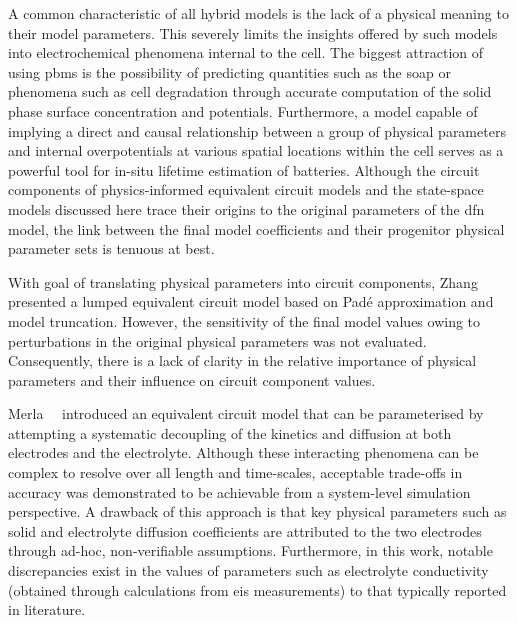 A  common  characteristic  of all  hybrid  models  is  the  lack of  a  physical
meaning to  their model  parameters. This severely  limits the  insights offered
by  such  models  into  electrochemical  phenomena internal  to  the  cell.  The
biggest  attraction  of  using  \glspl{pbm} is  the  possibility  of  predicting
quantities such as the \gls{soap} or  phenomena such as cell degradation through
accurate computation  of the solid  phase surface concentration  and potentials.
Furthermore,  a model  capable  of  implying a  direct  and causal  relationship
between a  group of physical  parameters and internal overpotentials  at various
spatial locations within the cell serves as a powerful tool for in-situ lifetime
estimation  of batteries.  Although the  circuit components  of physics-informed
equivalent circuit models and the  state-space models discussed here trace their
origins to the original parameters of  the \gls{dfn} model, the link between the
final model coefficients and their progenitor physical parameter sets is tenuous
at best.


With  goal   of  translating   physical  parameters  into   circuit  components,
Zhang~\etal{}~\cite{Zhang2017} presented a lumped equivalent circuit model based
on Padé  approximation and  model truncation. However,  the sensitivity  of the
final model  values owing to  perturbations in the original  physical parameters
was not  evaluated. Consequently,  there is  a lack of  clarity in  the relative
importance  of physical  parameters  and their  influence  on circuit  component
values.


Merla~\etal{}~\cite{Merla2018} introduced  an equivalent circuit model  that can
be  parameterised by  attempting a  systematic  decoupling of  the kinetics  and
diffusion at  both electrodes  and the  electrolyte. Although  these interacting
phenomena can be complex to resolve  over all length and time-scales, acceptable
trade-offs in  accuracy was  demonstrated to be  achievable from  a system-level
simulation  perspective.  A drawback  of  this  approach  is that  key  physical
parameters such as  solid and electrolyte diffusion  coefficients are attributed
to the  two electrodes through ad-hoc,  non-verifiable assumptions. Furthermore,
in  this work,  notable discrepancies  exist in  the values  of parameters  such
as  electrolyte  conductivity  (obtained  through  calculations  from  \gls{eis}
measurements) to that typically reported  in literature. 


